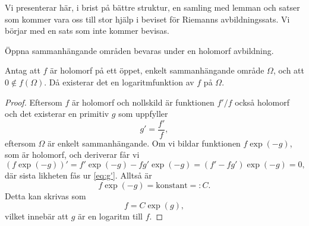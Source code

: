 Vi presenterar här, i brist på bättre struktur, en samling med lemman och satser som kommer vara oss till stor hjälp i beviset för Riemanns avbildningssats. Vi börjar med en sats som inte kommer bevisas.

\begin{theorem}\label{thm:öppna_områden_bevaras}
	Öppna sammanhängande områden bevaras under en holomorf avbildning.
\end{theorem}

\begin{lemma}\label{lem:existens_logaritm}
	Antag att $f$ är holomorf på ett öppet, enkelt sammanhängande område $\Omega$, och att $0 \notin f(\Omega)$. Då existerar det en logaritmfunktion av $f$ på $\Omega$.
\end{lemma}

\begin{proof}
	Eftersom $f$ är holomorf och nollskild är funktionen $f'/f$ också holomorf och det existerar en primitiv $g$ som uppfyller
	\begin{equation} \label{eq:g'}
		g' = \frac{f'}{f},
	\end{equation}
	eftersom $\Omega$ är enkelt sammanhängande. Om vi bildar funktionen $f \exp(-g)$, som är holomorf, och deriverar får vi
	\begin{equation*}
		(f \exp(-g))' = f' \exp(-g) - fg'\exp(-g) = (f'-fg')\exp(-g) = 0,
	\end{equation*}
	där sista likheten fås ur \eqref{eq:g'}. Alltså är
	\begin{equation*}
		f \exp(-g) = \text{konstant} =: C.
	\end{equation*}
	Detta kan skrivas som
	\begin{equation*}
		f = C \exp(g),
	\end{equation*}
	vilket innebär att $g$ är en logaritm till $f$.

\end{proof}

